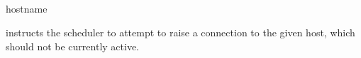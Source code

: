 \subsection{\BtconnName}

\begin{expara}

\BtconnName{} hostname

\end{expara}

\PrBtconn{} instructs the \ProductName{} scheduler to attempt to raise a connection to the given host, which should not be currently active.


